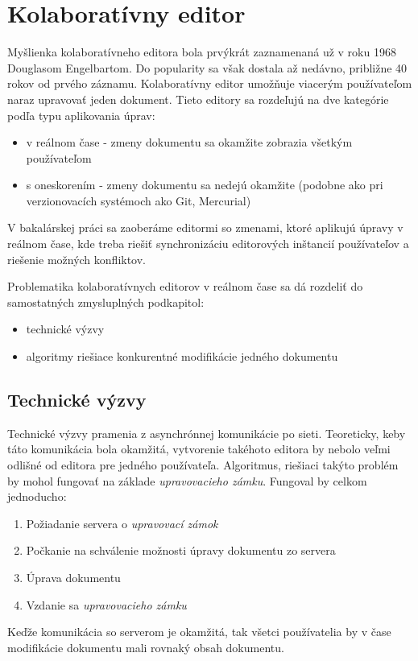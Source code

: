 \chapter{Kolaboratívny editor}

\label{kap:zdialtelnost} %

Myšlienka kolaboratívneho editora bola prvýkrát zaznamenaná už v roku 1968 Douglasom Engelbartom. 
Do popularity sa však dostala až nedávno, približne 40 rokov od prvého záznamu.
Kolaboratívny editor umožňuje viacerým používateľom naraz upravovať jeden dokument.
Tieto editory sa rozdeľujú na dve kategórie podľa typu aplikovania úprav:
\begin{itemize}
  \item v reálnom čase - zmeny dokumentu sa okamžite zobrazia všetkým používateľom
  \item s oneskorením - zmeny dokumentu sa nedejú okamžite (podobne ako pri ver\-zio\-no\-va\-cích
  systémoch ako Git, Mercurial)
\end{itemize}
V bakalárskej práci sa zaoberáme editormi so zmenami, ktoré aplikujú úpravy v reálnom čase, kde treba
riešiť synchronizáciu editorových inštancií používateľov a riešenie možných konfliktov.

Problematika kolaboratívnych editorov v reálnom čase sa dá rozdeliť do samostatných zmysluplných 
podkapitol:
\begin{itemize}
\item  technické výzvy
\item  algoritmy riešiace konkurentné modifikácie jedného dokumentu
\end{itemize}

\section{Technické výzvy}
Technické výzvy pramenia z asynchrónnej komunikácie po sieti. Teoreticky, keby táto 
komunikácia bola okamžitá, vytvorenie takéhoto editora by nebolo veľmi odlišné od
editora pre jedného používateľa. Algoritmus\label{algo:nesubezne_editovanie}, 
riešiaci takýto problém by mohol fungovať na základe 
\textit{upravovacieho zámku}. Fungoval by celkom jednoducho:
\begin{enumerate}
  \item Požiadanie servera o \textit{upravovací zámok}
  \item Počkanie na schválenie možnosti úpravy dokumentu zo servera
  \item Úprava dokumentu
  \item Vzdanie sa \textit{upravovacieho zámku}
\end{enumerate}
Keďže komunikácia so serverom je okamžitá, tak všetci používatelia by v čase modifikácie
dokumentu mali rovnaký obsah dokumentu. 

